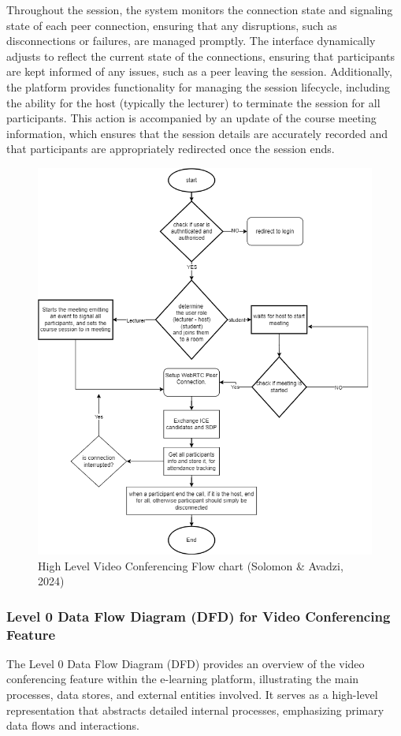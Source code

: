 \documentclass[a4paper,12pt]{article}  %
\begin{document}
Throughout the session, the system monitors the connection state and signaling state of each peer connection, ensuring that any disruptions, such as disconnections or failures, are managed promptly. The interface dynamically adjusts to reflect the current state of the connections, ensuring that participants are kept informed of any issues, such as a peer leaving the session. Additionally, the platform provides functionality for managing the session lifecycle, including the ability for the host (typically the lecturer) to terminate the session for all participants. This action is accompanied by an update of the course meeting information, which ensures that the session details are accurately recorded and that participants are appropriately redirected once the session ends.\\

\begin{figure}[H]
      \centering
      \includegraphics[width=1\textwidth]{figures/webrtc.drawio.png}
      \caption{High Level Video Conferencing Flow chart (Solomon \& Avadzi, 2024)}
\end{figure}

\subsubsection{Level 0 Data Flow Diagram (DFD) for Video Conferencing Feature}
The Level 0 Data Flow Diagram (DFD) provides an overview of the video
conferencing feature within the e-learning platform, illustrating the main
processes, data stores, and external entities involved. It serves as a
high-level representation that abstracts detailed internal processes,
emphasizing primary data flows and interactions.\\
\end{document}
